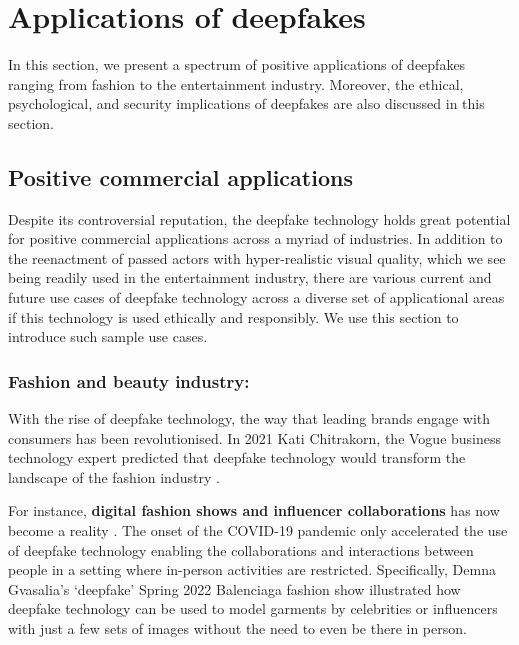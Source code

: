 \section{Applications of deepfakes} \label{sec:applications}
In this section, we present a spectrum of positive applications of deepfakes ranging from fashion to the entertainment industry. Moreover, the ethical, psychological, and security implications of deepfakes are also discussed in this section. 

\subsection{Positive commercial applications}

Despite its controversial reputation, the deepfake technology holds great potential for positive commercial applications across a myriad of industries. In addition to the reenactment of passed actors with hyper-realistic visual quality, which we see being readily used in the entertainment industry, there are various current and future use cases of deepfake technology across a diverse set of applicational areas if this technology is used ethically and responsibly. We use this section to introduce such sample use cases.  

\subsubsection{Fashion and beauty industry:}
With the rise of deepfake technology, the way that leading brands engage with consumers has been revolutionised. In 2021 Kati Chitrakorn, the Vogue business technology expert predicted that deepfake technology would transform the landscape of the fashion industry \cite{deepfakevoguebusiness}. 

For instance, \textbf{digital fashion shows and influencer collaborations} has now become a reality \cite{deepfakeglamour}. The onset of the COVID-19 pandemic only accelerated the use of deepfake technology enabling the collaborations and interactions between people in a setting where in-person activities are restricted. Specifically, Demna Gvasalia's `deepfake' Spring 2022 Balenciaga fashion show illustrated how deepfake technology can be used to model garments by celebrities or influencers with just a few sets of images without the need to even be there in person.  

